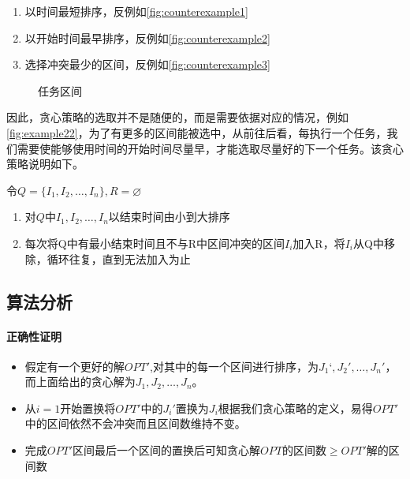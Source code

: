 \begin{enumerate}
	\item 以时间最短排序，反例如\autoref{fig:counterexample1}
	\item 以开始时间最早排序，反例如\autoref{fig:counterexample2}
	\item 选择冲突最少的区间，反例如\autoref{fig:counterexample3}
\end{enumerate}



\begin{figure}[hbt!]
		\centering
	\caption{任务区间}\label{fig:example22}
\end{figure}
\newpage
因此，贪心策略的选取并不是随便的，而是需要依据对应的情况，例如\autoref{fig:example22}，为了有更多的区间能被选中，从前往后看，每执行一个任务，我们需要使能够使用时间的开始时间尽量早，才能选取尽量好的下一个任务。该贪心策略说明如下。

令$Q=\{I_1, I_2, \ldots, I_n\},R=\varnothing$

\begin{enumerate}
    \item 对$Q$中$I_1, I_2, \ldots, I_n$以结束时间由小到大排序
    \item 每次将Q中有最小结束时间且不与R中区间冲突的区间$I_i$加入R，将$I_i$从Q中移除，循环往复，直到无法加入为止
\end{enumerate}

\subsection{算法分析}
\paragraph*{正确性证明}
\begin{itemize}
    \item 假定有一个更好的解$OPT'$,对其中的每一个区间进行排序，为$J_1‘,J_2',\ldots,J_n'$，而上面给出的贪心解为$J_1,J_2,\ldots,J_n$。
    \item 从$i=1$开始置换将$OPT'$中的$J_i'置换为J_i$根据我们贪心策略的定义，易得$OPT'$中的区间依然不会冲突而且区间数维持不变。
    \item 完成$OPT'$区间最后一个区间的置换后可知贪心解$OPT$的区间数$\geq OPT'$解的区间数
\end{itemize}

